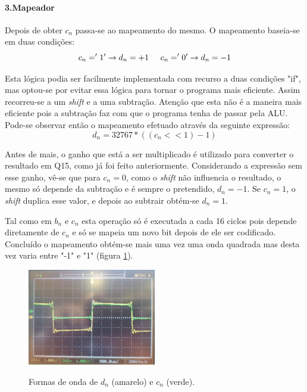 \documentclass[11pt]{article}
\numberwithin{equation}{section}
\begin{document}
	\paragraph{3.Mapeador} \hspace{0pt}
	\label{para:P2-3}
	
	Depois de obter $ c_n $ passa-se ao mapeamento do mesmo. O mapeamento baseia-se em duas condições:
	\begin{equation}
	c_n= '1' \rightarrow d_n =+1 \hspace{5 mm} c_n='0' \rightarrow d_n=-1
	\end{equation}
	
	Esta lógica podia ser facilmente implementada com recurso a duas condições "if", mas optou-se por evitar essa lógica para tornar o programa mais eficiente.
	Assim recorreu-se a um \textit{shift} e a uma subtração. Atenção que esta não é a maneira mais eficiente pois a subtração faz com que o programa tenha de passar pela ALU.
	Pode-se observar então o mapeamento efetuado através da seguinte expressão:
	\begin{equation}
	d_n=32767*((c_n << 1)-1)
	\end{equation}
	
	Antes de mais, o ganho que está a ser multiplicado é utilizado para converter o resultado em Q15, como já foi feito anteriormente. Considerando a expressão sem esse ganho, vê-se que para $ c_n=0 $, como o \textit{shift} não influencia o resultado, o mesmo só depende da subtração e é sempre o pretendido, $d_n=-1$. Se $c_n=1$, o \textit{shift} duplica  esse valor, e depois ao subtrair obtém-se $d_n=1$.
	
	Tal como em $b_n$ e $c_n$ esta operação só é executada a cada 16 ciclos pois depende diretamente de $c_n$ e só se mapeia um novo bit depois de ele ser codificado. Concluído o mapeamento obtém-se mais uma vez uma onda quadrada mas desta vez varia entre "-1" e "1" (figura \ref{cn_dn}).
	\begin{figure}[H]
		\centering
		\includegraphics[width=0.5\textwidth]{./cn_dn}~\\
		\caption{Formas de onda de $d_n$ (amarelo) e $c_n$ (verde).}
		\label{cn_dn}
	\end{figure}
	
\end{document}
